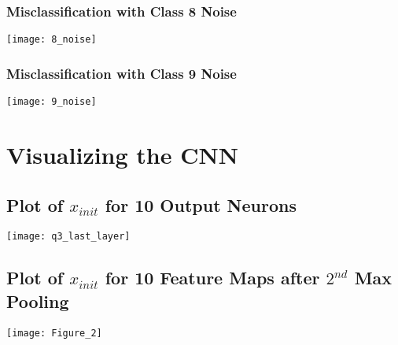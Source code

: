 \documentclass[a4paper]{article}
\begin{document}
\subsubsection{Misclassification with Class 8 Noise}
\begin{center}
\texttt{[image: 8\_noise]}
\end{center}

\subsubsection{Misclassification with Class 9 Noise}
\begin{center}
\texttt{[image: 9\_noise]}
\end{center}

\section{Visualizing the CNN}
\subsection{Plot of $x_{init}$ for 10 Output Neurons}
\begin{center}
\texttt{[image: q3\_last\_layer]}
\end{center}

\subsection{Plot of $x_{init}$ for 10 Feature Maps after $2^{nd}$ Max Pooling}
\begin{center}
\texttt{[image: Figure\_2]}
\end{center}
\end{document}

